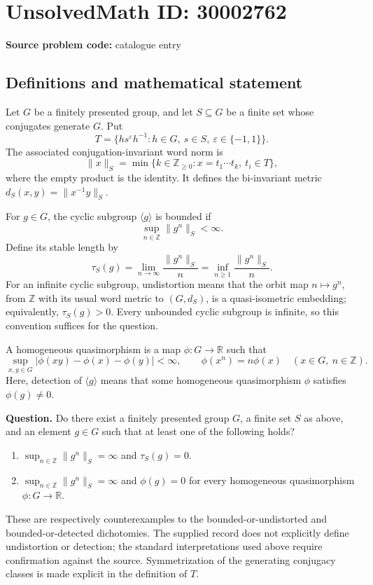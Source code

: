 \documentclass[11pt]{article}
\newcommand{\Z}{\mathbb{Z}}
\newcommand{\R}{\mathbb{R}}
\begin{document}
\section*{UnsolvedMath ID: 30002762}
\textbf{Source problem code:} catalogue entry
\subsection{Definitions and mathematical statement}
Let \(G\) be a finitely presented group, and let \(S\subseteq G\) be a finite set whose conjugates generate \(G\). Put
\[
T=\{h s^{\varepsilon}h^{-1}:h\in G,\ s\in S,\ \varepsilon\in\{-1,1\}\}.
\]
The associated conjugation-invariant word norm is
\[
\|x\|_S=\min\{k\in\Z_{\geq0}:x=t_1\cdots t_k,\ t_i\in T\},
\]
where the empty product is the identity. It defines the bi-invariant metric \(d_S(x,y)=\|x^{-1}y\|_S\).

For \(g\in G\), the cyclic subgroup \(\langle g\rangle\) is bounded if
\[
\sup_{n\in\Z}\|g^n\|_S<\infty.
\]
Define its stable length by
\[
\tau_S(g)=\lim_{n\to\infty}\frac{\|g^n\|_S}{n}
=\inf_{n\geq1}\frac{\|g^n\|_S}{n}.
\]
For an infinite cyclic subgroup, undistortion means that the orbit map \(n\mapsto g^n\), from \(\Z\) with its usual word metric to \((G,d_S)\), is a quasi-isometric embedding; equivalently, \(\tau_S(g)>0\). Every unbounded cyclic subgroup is infinite, so this convention suffices for the question.

A homogeneous quasimorphism is a map \(\phi:G\to\R\) such that
\[
\sup_{x,y\in G}|\phi(xy)-\phi(x)-\phi(y)|<\infty,
\qquad
\phi(x^n)=n\phi(x)\quad(x\in G,\ n\in\Z).
\]
Here, detection of \(\langle g\rangle\) means that some homogeneous quasimorphism \(\phi\) satisfies \(\phi(g)\ne0\).

\textbf{Question.} Do there exist a finitely presented group \(G\), a finite set \(S\) as above, and an element \(g\in G\) such that at least one of the following holds?
\begin{enumerate}
\item \(\displaystyle\sup_{n\in\Z}\|g^n\|_S=\infty\) and \(\tau_S(g)=0\).
\item \(\displaystyle\sup_{n\in\Z}\|g^n\|_S=\infty\) and \(\phi(g)=0\) for every homogeneous quasimorphism \(\phi:G\to\R\).
\end{enumerate}
These are respectively counterexamples to the bounded-or-undistorted and bounded-or-detected dichotomies. The supplied record does not explicitly define undistortion or detection; the standard interpretations used above require confirmation against the source. Symmetrization of the generating conjugacy classes is made explicit in the definition of \(T\).
\end{document}
